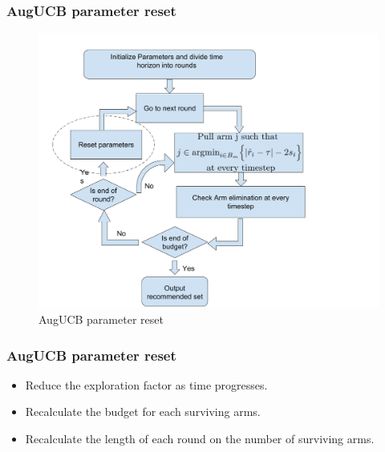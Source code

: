 \begin{frame}
\frametitle{AugUCB parameter reset}
\begin{figure}
\caption{AugUCB parameter reset}
\includegraphics[scale=0.178]{img/AugUCB_flow_reset.png}
\end{figure}
\end{frame}


\begin{frame}
\frametitle{AugUCB parameter reset}
\begin{itemize}
\item<1-> Reduce the exploration factor as time progresses.
\item<2-> Recalculate the budget for each surviving arms.
\item<3-> Recalculate the length of each round on the number of surviving arms.
\end{itemize}
\end{frame}


